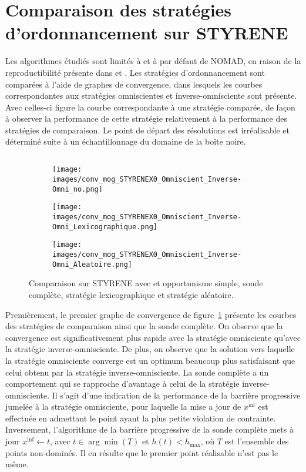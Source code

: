 \section{Comparaison des stratégies d'ordonnancement sur STYRENE}\label{sec:com3}
Les algorithmes étudiés sont limités à \MADS et à \MADS par défaut de NOMAD, en raison de la reproductibilité présente dans \CS et \GPS. Les stratégies d'ordonnancement sont comparées à l'aide de graphes de convergence, dans lesquels les courbes correspondantes aux stratégies omniscientes et inverse-omnisciente sont présente. Avec celles-ci figure la courbe correspondante à une stratégie comparée, de façon à observer la performance de cette stratégie relativement à la performance des stratégies de comparaison. Le point de départ des résolutions est irréalisable et déterminé suite à un échantillonnage du domaine de la boîte noire.
\subsection{\MADS}
\label{sec:sty_mads}
\begin{figure}[!htb]
	\centering
	\begin{subfigure}{0.43\textwidth}
		\texttt{[image: images/conv\_mog\_STYRENEX0\_Omniscient\_Inverse-Omni\_no.png]}
	\end{subfigure}
	\hspace*{\fill}
	\smallskip
	\begin{subfigure}{0.43\textwidth}
		\texttt{[image: images/conv\_mog\_STYRENEX0\_Omniscient\_Inverse-Omni\_Lexicographique.png]}
	\end{subfigure}%
	\begin{subfigure}{0.43\textwidth}
		\texttt{[image: images/conv\_mog\_STYRENEX0\_Omniscient\_Inverse-Omni\_Aleatoire.png]}
	\end{subfigure}
	\caption{Comparaison sur STYRENE avec \MADS et opportunisme simple, sonde complète, stratégie lexicographique et stratégie aléatoire.}
	\label{fig:m_styrene_1}
\end{figure}
Premièrement, le premier graphe de convergence de figure~\ref{fig:m_styrene_1} présente les courbes des stratégies de comparaison ainsi que la sonde complète. On observe que la convergence est significativement plus rapide avec la stratégie omnisciente qu'avec la stratégie inverse-omnisciente. De plus, on observe que la solution vers laquelle la stratégie omnisciente converge est un optimum beaucoup plus satisfaisant que celui obtenu par la stratégie inverse-omnisciente. La sonde complète a un comportement qui se rapproche d'avantage à celui de la stratégie inverse-omnisciente. Il s'agit d'une indication de la performance de la barrière progressive jumelée à la stratégie omnisciente, pour laquelle la mise a jour de $x^{\inf}$ est effectuée en admettant le point ayant la plus petite violation de contrainte. Inversement, l'algorithme de la barrière progressive de la sonde complète mets à jour $x^{\inf} \leftarrow t$, avec $t\in \arg \min{(T)}$ et $h(t)<h_{\max}$, où $T$ est l'ensemble des points non-dominés. Il en résulte que le premier point réalisable n'est pas le même.


